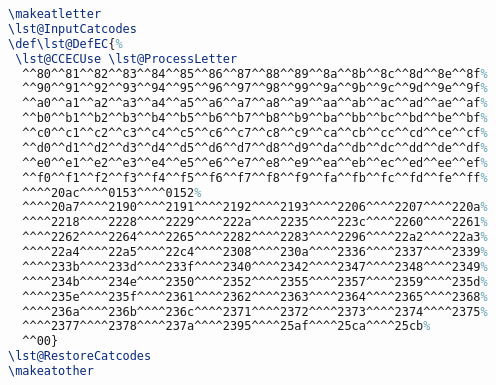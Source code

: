 \begin{tcolorbox}[breakable, size=fbox, boxrule=1pt, pad at break*=1mm,colback=cellbackground, colframe=cellborder]
\begin{lstlisting}[language=TeX,frame=single,framerule=0pt,label=lst:scr1837X0]
% set lstlisting to accept UTF-8 APL text
\makeatletter
\lst@InputCatcodes
\def\lst@DefEC{%
 \lst@CCECUse \lst@ProcessLetter
  ^^80^^81^^82^^83^^84^^85^^86^^87^^88^^89^^8a^^8b^^8c^^8d^^8e^^8f%
  ^^90^^91^^92^^93^^94^^95^^96^^97^^98^^99^^9a^^9b^^9c^^9d^^9e^^9f%
  ^^a0^^a1^^a2^^a3^^a4^^a5^^a6^^a7^^a8^^a9^^aa^^ab^^ac^^ad^^ae^^af%
  ^^b0^^b1^^b2^^b3^^b4^^b5^^b6^^b7^^b8^^b9^^ba^^bb^^bc^^bd^^be^^bf%
  ^^c0^^c1^^c2^^c3^^c4^^c5^^c6^^c7^^c8^^c9^^ca^^cb^^cc^^cd^^ce^^cf%
  ^^d0^^d1^^d2^^d3^^d4^^d5^^d6^^d7^^d8^^d9^^da^^db^^dc^^dd^^de^^df%
  ^^e0^^e1^^e2^^e3^^e4^^e5^^e6^^e7^^e8^^e9^^ea^^eb^^ec^^ed^^ee^^ef%
  ^^f0^^f1^^f2^^f3^^f4^^f5^^f6^^f7^^f8^^f9^^fa^^fb^^fc^^fd^^fe^^ff%
  ^^^^20ac^^^^0153^^^^0152%
  ^^^^20a7^^^^2190^^^^2191^^^^2192^^^^2193^^^^2206^^^^2207^^^^220a%
  ^^^^2218^^^^2228^^^^2229^^^^222a^^^^2235^^^^223c^^^^2260^^^^2261%
  ^^^^2262^^^^2264^^^^2265^^^^2282^^^^2283^^^^2296^^^^22a2^^^^22a3%
  ^^^^22a4^^^^22a5^^^^22c4^^^^2308^^^^230a^^^^2336^^^^2337^^^^2339%
  ^^^^233b^^^^233d^^^^233f^^^^2340^^^^2342^^^^2347^^^^2348^^^^2349%
  ^^^^234b^^^^234e^^^^2350^^^^2352^^^^2355^^^^2357^^^^2359^^^^235d%
  ^^^^235e^^^^235f^^^^2361^^^^2362^^^^2363^^^^2364^^^^2365^^^^2368%
  ^^^^236a^^^^236b^^^^236c^^^^2371^^^^2372^^^^2373^^^^2374^^^^2375%
  ^^^^2377^^^^2378^^^^237a^^^^2395^^^^25af^^^^25ca^^^^25cb%
  ^^00}
\lst@RestoreCatcodes
\makeatother
\end{lstlisting}
\end{tcolorbox}





%